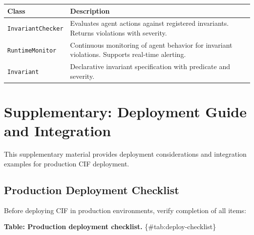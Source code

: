 \documentclass[
]{article}
\newcounter{none} %
\begin{document}
{\def\LTcaptype{none} %
\begin{longtable}[]{@{}
  >{\raggedright\arraybackslash}p{}
  >{\raggedright\arraybackslash}p{}@{}}
\toprule\noalign{}
\begin{minipage}[b]{\linewidth}\raggedright
Class
\end{minipage} & \begin{minipage}[b]{\linewidth}\raggedright
Description
\end{minipage} \\
\midrule\noalign{}
\endhead
\bottomrule\noalign{}
\endlastfoot
\texttt{InvariantChecker} & Evaluates agent actions against registered
invariants. Returns violations with severity. \\
\texttt{RuntimeMonitor} & Continuous monitoring of agent behavior for
invariant violations. Supports real-time alerting. \\
\texttt{Invariant} & Declarative invariant specification with predicate
and severity. \\
\end{longtable}
}

\newpage

\newpage

\section{Supplementary: Deployment Guide and
Integration}\label{sec:deployment}

This supplementary material provides deployment considerations and
integration examples for production CIF deployment.

\subsection{Production Deployment
Checklist}\label{sec:production-checklist}

Before deploying CIF in production environments, verify completion of
all items:

\textbf{Table: Production deployment checklist.}
\{\#tab:deploy-checklist\}
\end{document}
